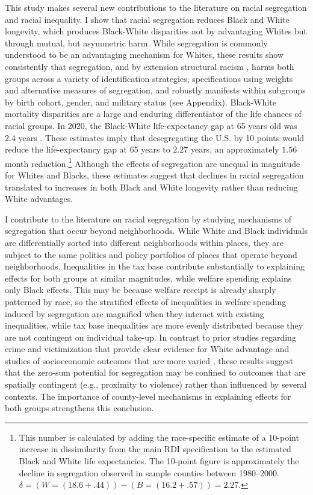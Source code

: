 \documentclass[11pt]{article}
\begin{document}
This study makes several new contributions to the literature on racial segregation and racial inequality. I show that racial segregation reduces Black and White longevity, which produces Black-White disparities not by advantaging Whites but through mutual, but asymmetric harm. While segregation is commonly understood to be an advantaging mechanism for Whites, these results show consistently that segregation, and by extension structural racism \citep{louie_fear_2024}, harms both groups across a variety of identification strategies, specifications using weights and alternative measures of segregation, and robustly manifests within subgroups by birth cohort, gender, and military status (see Appendix). Black-White mortality disparities are a large and enduring differentiator of the life chances of racial groups. In 2020, the Black-White life-expectancy gap at 65 years old was $2.4$ years \citep{arias_united_2022}. These estimates imply that desegregating the U.S. by 10 points would reduce the life-expectancy gap at 65 years to $2.27$ years, an approximately $1.56$ month reduction.\footnote{This number is calculated by adding the race-specific estimate of a 10-point increase in dissimilarity from the main RDI specification to the estimated Black and White life expectancies. The 10-point figure is approximately the decline in segregation observed in sample counties between 1980--2000. $\delta = (W = (18.6 + .44)) - (B = (16.2 + .57)) = 2.27$.} Although the effects of segregation are unequal in magnitude for Whites and Blacks, these estimates suggest that declines in racial segregation translated to increases in both Black and White longevity rather than reducing White advantages. 

I contribute to the literature on racial segregation by studying mechanisms of segregation that occur beyond neighborhoods. While White and Black individuals are differentially sorted into different neighborhoods within places, they are subject to the same politics and policy portfolios of places that operate beyond neighborhoods. Inequalities in the tax base contribute substantially to explaining effects for both groups at similar magnitudes, while welfare spending explains only Black effects. This may be because welfare receipt is already sharply patterned by race, so the stratified effects of inequalities in welfare spending induced by segregation are magnified when they interact with existing inequalities, while tax base inequalities are more evenly distributed because they are not contingent on individual take-up. In contrast to prior studies regarding crime and victimization \citep{light_segregation_2019} that provide clear evidence for White advantage and studies of socioeconomic outcomes that are more varied \citep{quillian_does_2014,cutler_are_1997}, these results suggest that the zero-sum potential for segregation may be confined to outcomes that are spatially contingent (e.g., proximity to violence) rather than influenced by several contexts. The importance of county-level mechanisms in explaining effects for both groups strengthens this conclusion.
\end{document}
